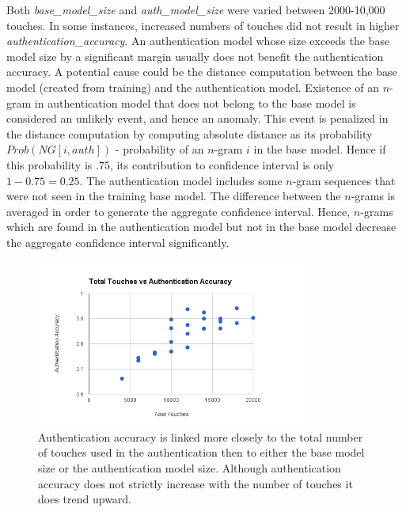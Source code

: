 \documentclass{acm_proc_article-sp}
\begin{document}
Both {\it base\_model\_size} and {\it auth\_model\_size} were varied between 2000-10,000 touches.
In some instances, 
increased numbers of touches did not result in higher {\it authentication\_accuracy}. 
An authentication model whose size exceeds the base model size by a significant margin usually
does not benefit the authentication accuracy.
%
A potential cause could be the distance computation 
between the base model (created from training) and the authentication model.
Existence of an $n$-gram in authentication model that does not belong to the base model
is considered an unlikely event, and hence an anomaly. 
This event is penalized in the distance computation
by computing absolute distance as its probability 
$Prob(NG[i, auth])$ - probability of an $n$-gram
$i$ in the base model.
Hence if this probability is $.75$, its contribution to
confidence interval is only $1-0.75=0.25$.
The authentication model includes some
$n$-gram sequences that were not seen in the training base model.
%
The difference between the $n$-grams is averaged
in order to generate the aggregate confidence interval.
Hence, $n$-grams which are found in the authentication model but not in the base model
decrease the aggregate confidence interval significantly.

\begin{figure}
\centering
\includegraphics[width=3.5in]{total_touches_vs_authentication_accuracy.png}
\caption{Authentication accuracy is linked more closely to the total number of touches used in the authentication then to either the base model size or the authentication model size. Although authentication accuracy does not strictly increase with the number of touches it does trend upward.}
\label{fig:total_touches_vs_authentication_accuracy}
\end{figure}
\end{document}
